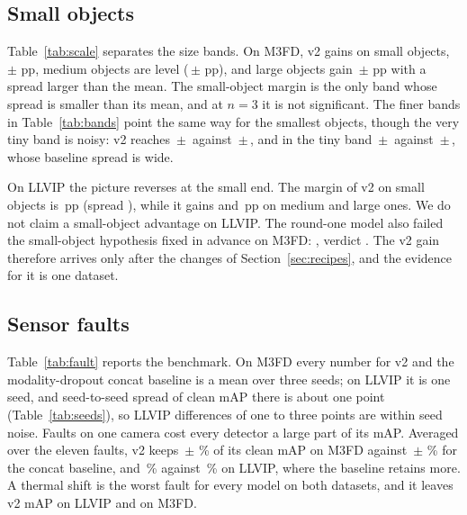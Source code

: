 \subsection{Small objects}
\label{sec:small}
Table~\ref{tab:scale} separates the size bands. On M3FD, v2 gains on small objects, \marMfdVtwoVsConcatMdMeanApSmall{}\,$\pm$\,\marMfdVtwoVsConcatMdStdApSmall{}\,pp, medium objects are level (\marMfdVtwoVsConcatMdMeanApMedium{}\,$\pm$\,\marMfdVtwoVsConcatMdStdApMedium{}\,pp), and large objects gain \marMfdVtwoVsConcatMdMeanApLarge{}\,$\pm$\,\marMfdVtwoVsConcatMdStdApLarge{}\,pp with a spread larger than the mean. The small-object margin is the only band whose spread is smaller than its mean, and at $n=3$ it is not significant. The finer bands in Table~\ref{tab:bands} point the same way for the smallest objects, though the very tiny band is noisy: v2 reaches \resMfdCffmVtwoMeanApBandVeryTiny{}\,$\pm$\,\resMfdCffmVtwoStdApBandVeryTiny{} against \resMfdConcatMdMeanApBandVeryTiny{}\,$\pm$\,\resMfdConcatMdStdApBandVeryTiny{}, and in the tiny band \resMfdCffmVtwoMeanApBandTiny{}\,$\pm$\,\resMfdCffmVtwoStdApBandTiny{} against \resMfdConcatMdMeanApBandTiny{}\,$\pm$\,\resMfdConcatMdStdApBandTiny{}, whose baseline spread is wide.

On LLVIP the picture reverses at the small end. The margin of v2 on small objects is \marLlvipVtwoVsConcatMdMeanApSmall{}\,pp (spread \marLlvipVtwoVsConcatMdStdApSmall{}), while it gains \marLlvipVtwoVsConcatMdMeanApMedium{} and \marLlvipVtwoVsConcatMdMeanApLarge{}\,pp on medium and large ones. We do not claim a small-object advantage on LLVIP. The round-one model also failed the small-object hypothesis fixed in advance on M3FD: \hypPhThreeEvidence{}, verdict \hypPhThreeVerdict{}. The v2 gain therefore arrives only after the changes of Section~\ref{sec:recipes}, and the evidence for it is one dataset.



\subsection{Sensor faults}
\label{sec:faults}
Table~\ref{tab:fault} reports the benchmark. On M3FD every number for v2 and the modality-dropout concat baseline is a mean over three seeds; on LLVIP it is one seed, and seed-to-seed spread of clean mAP there is about one point (Table~\ref{tab:seeds}), so LLVIP differences of one to three points are within seed noise. Faults on one camera cost every detector a large part of its mAP. Averaged over the eleven faults, v2 keeps \fltMfdCffmVtwoMeanRetainedSevThreePercent{}\,$\pm$\,\fltMfdCffmVtwoStdRetainedSevThreePercent{}\,\% of its clean mAP on M3FD against \fltMfdConcatMdMeanRetainedSevThreePercent{}\,$\pm$\,\fltMfdConcatMdStdRetainedSevThreePercent{}\,\% for the concat baseline, and \fltLlvipCffmVtwoRetainedSevThreePercent{}\,\% against \fltLlvipConcatMdRetainedSevThreePercent{}\,\% on LLVIP, where the baseline retains more. A thermal shift is the worst fault for every model on both datasets, and it leaves v2 \fltLlvipCffmVtwoWorstSevThreeMap{} mAP on LLVIP and \fltMfdCffmVtwoWorstSevThreeMap{} on M3FD.


